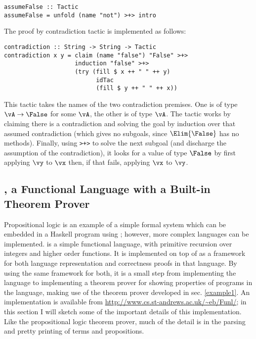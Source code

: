 \begin{verbatim}
assumeFalse :: Tactic
assumeFalse = unfold (name "not") >+> intro 
\end{verbatim}

The proof by contradiction tactic
is implemented as follows:
\\

\begin{verbatim}
contradiction :: String -> String -> Tactic
contradiction x y = claim (name "false") "False" >+>
                    induction "false" >+>
                    (try (fill $ x ++ " " ++ y)
                          idTac
                          (fill $ y ++ " " ++ x))
\end{verbatim}

This tactic takes the names of the two contradiction premises. One is
of type $\vA\to\False$ for some $\vA$, the other is of type $\vA$. The
tactic works by claiming there is a contradiction and solving the goal
by induction over that assumed contradiction (which gives no subgoals,
since $\Elim{\False}$ has no methods). Finally, using \texttt{>+>} to
solve the next subgoal (and discharge the assumption of the
contradiction), it looks for a value of type $\False$ by first
applying $\vy$ to $\vx$ then, if that fails, applying $\vx$ to $\vy$.

\subsection{\Funl{}, a Functional Language with a Built-in Theorem Prover}

\label{example2}

Propositional logic is an example of a simple formal system which can
be embedded in a Haskell program using \Ivor{}; however, more complex
languages can be implemented. \Funl{} is a simple functional language,
with primitive recursion over integers and higher order functions. It
is implemented on top of \Ivor{} as a framework for both language
representation and correctness proofs in that language. By using the
same framework for both, it is a small step from implementing the
language to implementing a theorem prover for showing properties of
programs in the language, making use of the theorem prover developed
in sec. \ref{example1}.
An implementation is available from
\url{http://www.cs.st-andrews.ac.uk/~eb/Funl/}; in this section I will
sketch some of the important details of this implementation. Like the
propositional logic theorem prover, much of the detail is in the
parsing and pretty printing of terms and propositions.

